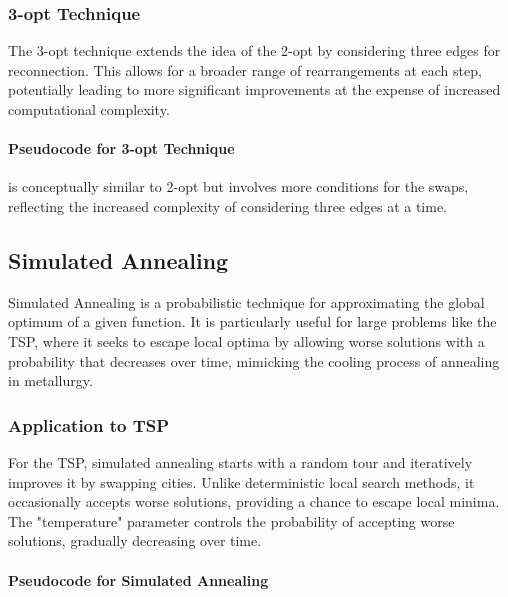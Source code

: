 \subsubsection{3-opt Technique}

The 3-opt technique extends the idea of the 2-opt by considering three edges for reconnection. This allows for a broader range of rearrangements at each step, potentially leading to more significant improvements at the expense of increased computational complexity.

\paragraph{Pseudocode for 3-opt Technique} is conceptually similar to 2-opt but involves more conditions for the swaps, reflecting the increased complexity of considering three edges at a time.

\subsection{Simulated Annealing}

Simulated Annealing is a probabilistic technique for approximating the global optimum of a given function. It is particularly useful for large problems like the TSP, where it seeks to escape local optima by allowing worse solutions with a probability that decreases over time, mimicking the cooling process of annealing in metallurgy.

\subsubsection{Application to TSP}

For the TSP, simulated annealing starts with a random tour and iteratively improves it by swapping cities. Unlike deterministic local search methods, it occasionally accepts worse solutions, providing a chance to escape local minima. The "temperature" parameter controls the probability of accepting worse solutions, gradually decreasing over time.

\paragraph{Pseudocode for Simulated Annealing}

